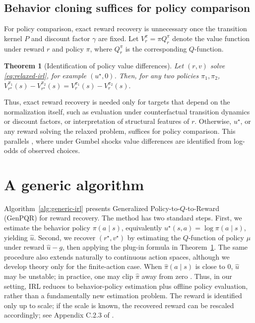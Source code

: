 \documentclass{article}
\newtheorem{theorem}{Theorem}
\newcommand{\1}{\mathbbm{1}}
\begin{document}
 

\subsection{Behavior cloning suffices for policy comparison}
\label{sec:aside}

For policy comparison, exact reward recovery is unnecessary once the transition
kernel \(P\) and discount factor \(\gamma\) are fixed. Let
\(V_r^\pi=\pi Q_r^\pi\) denote the value function under reward \(r\) and policy
\(\pi\), where \(Q_r^\pi\) is the corresponding \(Q\)-function.

\begin{theorem}[Identification of policy value differences]
\label{thm:identification}
Let \((r,v)\) solve \eqref{eq:relaxed-irl}, for example \((u^\star,0)\). Then, 
for any two policies \(\pi_1,\pi_2\), $V_{r^\star}^{\pi_1}(s)-V_{r^\star}^{\pi_2}(s)
 =
V_r^{\pi_1}(s)-V_r^{\pi_2}(s).$
\end{theorem}

Thus, exact reward recovery is needed only for targets that depend on the
normalization itself, such as evaluation under counterfactual transition
dynamics or discount factors, or interpretation of structural features of
\(r\). Otherwise, \(u^\star\), or any reward solving the relaxed problem,
suffices for policy comparison. This parallels \citet{hotz1993conditional},
where under Gumbel shocks value differences are identified from log-odds of
observed choices.

\section{A generic algorithm}
\label{sec:genalg}
Algorithm~\ref{alg:generic-irl} presents Generalized
Policy-to-\(Q\)-to-Reward (GenPQR) for reward recovery. The method has two
standard steps. First, we estimate the behavior policy \(\pi(a \mid s)\),
equivalently \(u^\star(s,a)=\log \pi(a \mid s)\), yielding \(\hat u\).
Second, we recover \((r^\star,v^\star)\) by estimating the \(Q\)-function of
policy \(\mu\) under reward \(\hat u-g\), then applying the plug-in formula in
Theorem~\ref{thm:identification}. The same procedure also extends naturally to
continuous action spaces, although we develop theory only for the finite-action
case. When \(\hat \pi(a\mid s)\) is close to \(0\), \(\hat u\) may be unstable;
in practice, one may clip \(\hat \pi\) away from zero
\citep{ionides2008truncated}. Thus, in our setting, IRL reduces to
behavior-policy estimation plus offline policy evaluation, rather than a
fundamentally new estimation problem. The reward is identified only up to scale; if the scale is known, the recovered reward can be rescaled accordingly; see Appendix C.2.3 of \citet{geng2020deep}.
\end{document}
